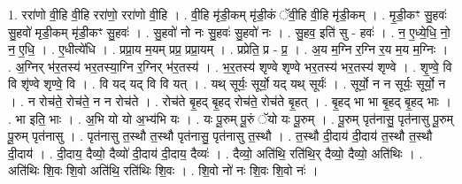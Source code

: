 \documentclass[17pt]{extarticle}
\begin{document}
1. ररा॑णो वी॒हि वी॒हि ररा॑णो॒ ररा॑णो वी॒हि । . वी॒हि मृ॑डी॒कम् मृ॑डी॒कं ॅवी॒हि वी॒हि मृ॑डी॒कम् । . मृ॒डी॒कꣳ सु॒हवः॑ सु॒हवो॑ मृडी॒कम् मृ॑डी॒कꣳ सु॒हवः॑ । . सु॒हवो॑ नो नः सु॒हवः॑ सु॒हवो॑ नः । . सु॒हव॒ इति॑ सु - हवः॑ । . न॒ ए॒ध्ये॒धि॒ नो॒ न॒ ए॒धि॒ । . ए॒धीत्ये॑धि । . प्रप्रा॒य म॒यम् प्रप्र॒ प्रप्रा॒यम् । . प्रप्रेति॒ प्र - प्र॒ । . अ॒य म॒ग्नि र॒ग्नि र॒य म॒य म॒ग्निः । . अ॒ग्निर् भ॑र॒तस्य॑ भर॒तस्या॒ग्नि र॒ग्निर् भ॑र॒तस्य॑ । . भ॒र॒तस्य॑ शृण्वे शृण्वे भर॒तस्य॑ भर॒तस्य॑ शृण्वे । . शृ॒ण्वे॒ वि वि शृ॑ण्वे शृण्वे॒ वि । . वि यद् यद् वि वि यत् । . यथ् सूर्यः॒ सूर्यो॒ यद् यथ् सूर्यः॑ । . सूर्यो॒ न न सूर्यः॒ सूर्यो॒ न । . न रोच॑ते॒ रोच॑ते॒ न न रोच॑ते । . रोच॑ते बृ॒हद् बृ॒हद् रोच॑ते॒ रोच॑ते बृ॒हत् । . बृ॒हद् भा भा बृ॒हद् बृ॒हद् भाः । . भा इति॒ भाः । . अ॒भि यो यो अ॒भ्य॑भि यः । . यः पू॒रुम् पू॒रुं ॅयो यः पू॒रुम् । . पू॒रुम् पृत॑नासु॒ पृत॑नासु पू॒रुम् पू॒रुम् पृत॑नासु । . पृत॑नासु त॒स्थौ त॒स्थौ पृत॑नासु॒ पृत॑नासु त॒स्थौ । . त॒स्थौ दी॒दाय॑ दी॒दाय॑ त॒स्थौ त॒स्थौ दी॒दाय॑ । . दी॒दाय॒ दैव्यो॒ दैव्यो॑ दी॒दाय॑ दी॒दाय॒ दैव्यः॑ । . दैव्यो॒ अति॑थि॒ रति॑थि॒र् दैव्यो॒ दैव्यो॒ अति॑थिः । . अति॑थिः शि॒वः शि॒वो अति॑थि॒ रति॑थिः शि॒वः । . शि॒वो नो॑ नः शि॒वः शि॒वो नः॑ । \newline
\end{document}
